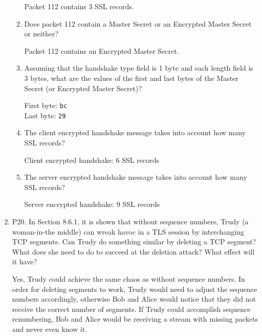 \documentclass[12pt]{article}
\begin{document}
\begin{enumerate}
\begin{enumerate}
		\color{CrispBlue}Packet 112 contains 3 SSL records.
		\color{black}
		\item Does packet 112 contain a Master Secret or an Encrypted Master Secret or neither?\par
		\color{CrispBlue}Packet 112 contains an Encrypted Master Secret.
		\color{black}
		\item Assuming that the handshake type field is 1 byte and each length field is 3 bytes, what are the values of the first and last bytes of the Master Secret (or Encrypted Master Secret)?\par
		\color{CrispBlue}First byte: \texttt{bc}\\ Last byte: \texttt{29}
		\color{black}
		\item The client encrypted handshake message takes into account how many SSL records?\par
		\color{CrispBlue}Client encrypted handshake: 6 SSL records
		\color{black}
		\item The server encrypted handshake message takes into account how many SSL records?\par
		\color{CrispBlue}Server encrypted handshake: 9 SSL records
		\color{black}
	\end{enumerate}
	\item P20. In Section 8.6.1, it is shown that without sequence numbers, Trudy (a woman-in-the middle) can wreak havoc in a TLS session by interchanging TCP segments. Can Trudy do something similar by deleting a TCP segment? What does she need to do to succeed at the deletion attack? What effect will it have?\par
	\color{CrispBlue}Yes, Trudy could achieve the same chaos as without sequence numbers. In order for deleting segments to work, Trudy would need to adjust the sequence numbers accordingly, otherwise Bob and Alice would notice that they did not receive the correct number of segments. If Trudy could accomplish sequence renumbering, Bob and Alice would be receiving a stream with missing packets and never even know it.
	\color{black}
\end{enumerate}
\end{document}
